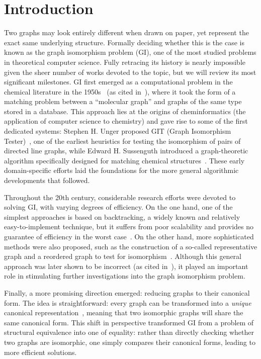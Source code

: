 \chapter{Introduction}

Two graphs may look entirely different when drawn on paper, yet represent the exact same underlying structure. Formally deciding whether this is the case is known as the graph isomorphism problem (GI), one of the most studied problems in theoretical computer science. Fully retracing its history is nearly impossible given the sheer number of works devoted to the topic, but we will review its most significant milestones. GI first emerged as a computational problem in the chemical literature in the 1950s~\cite{ray1957finding} (as cited in~\cite{grohe2020graph}), where it took the form of a matching problem between a ``molecular graph'' and graphs of the same type stored in a database. This approach lies at the origins of cheminformatics (the application of computer science to chemistry) and gave rise to some of the first dedicated systems: Stephen H. Unger proposed GIT (Graph Isomorphism Tester)~\cite{unger1964git}, one of the earliest heuristics for testing the isomorphism of pairs of directed line graphs, while Edward H. Sussenguth introduced a graph-theoretic algorithm specifically designed for matching chemical structures~\cite{sussenguth1965graph}. These early domain-specific efforts laid the foundations for the more general algorithmic developments that followed.

Throughout the 20th century, considerable research efforts were devoted to solving GI, with varying degrees of efficiency. On the one hand, one of the simplest approaches is based on backtracking, a widely known and relatively easy-to-implement technique, but it suffers from poor scalability and provides no guarantee of efficiency in the worst case~\cite{schmidt1976fast}. On the other hand, more sophisticated methods were also proposed, such as the construction of a so-called representative graph and a reordered graph to test for isomorphism~\cite{corneil1970efficient}. Although this general approach was later shown to be incorrect (as cited in~\cite{foggia2001performance}), it played an important role in stimulating further investigations into the graph isomorphism problem.

Finally, a more promising direction emerged: reducing graphs to their canonical form. The idea is straightforward: every graph can be transformed into a \textit{unique} canonical representation~\cite{arlazarov1974algorithm}, meaning that two isomorphic graphs will share the same canonical form. This shift in perspective transformed GI from a problem of structural equivalence into one of equality: rather than directly checking whether two graphs are isomorphic, one simply compares their canonical forms, leading to more efficient solutions.

